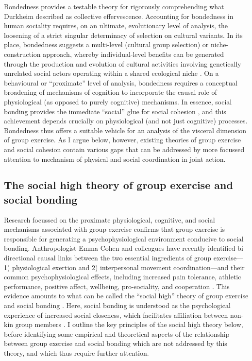 \begin{CJK}{UTF8}{gbsn}
Bondedness provides a testable theory for rigorously comprehending what Durkheim described as collective effervescence.  Accounting for bondedness in human sociality requires, on an ultimate, evolutionary level of analysis, the loosening of a strict singular determinacy of selection on cultural variants.  In its place, bondedness suggests a multi-level (cultural group selection) or niche-construction approach, whereby individual-level benefits can be generated through the production and evolution of cultural activities involving genetically unrelated social actors operating within a shared ecological niche \citep{Dunbar2012,Laland2010,Laland2015}.  On a behavioural or ``proximate'' level of analysis, bondedness requires a conceptual broadening of mechanisms of cognition to incorporate the causal role of physiological (as opposed to purely cognitive) mechanisms. In essence, social bonding provides the immediate ``social'' glue for social cohesion \citep[see][]{Lakin2003,Bastian2014a}, and this achievement depends crucially on physiological (and not just cognitive) processes.  Bondedness thus offers a suitable vehicle for an analysis of the visceral dimension of group exercise.  As I argue below, however, existing theories of group exercise and social cohesion contain various gaps that can be addressed by more focussed attention to mechanism of physical and social coordination in joint action.

\subsection{The social high theory of group exercise and social bonding \label{sect:socialHigh}}

Research focussed on the proximate physiological, cognitive, and social mechanisms associated with group exercise confirms that group exercise is responsible for generating a psychophysiological environment conducive to social bonding.  Anthropologist Emma Cohen and colleagues have recently identified bi-directional causal links between the two essential ingredients of group exercise---1) physiological exertion and 2) interpersonal movement coordination---and their common psychophysiological effects, including increased pain tolerance, athletic performance, positive affect, wellbeing, pro-sociality, and cooperation \citep{Davis2015}.  This evidence amounts to what can be called the ``social high'' theory of group exercise and social bonding \citep[hereafter ``the social high theory,'' see][]{Cohen2017}.  Here, social bonding is understood as the psychological experience of increased social closeness, which facilitates affiliation between non-kin group members \citep{Tarr2014}.  I outline the key principles of the social high theory below, before identifying some empirical and theoretical aspects of the relationship between group exercise and social bonding which are not addressed by this theory, and which thus require further attention.


\end{CJK}
